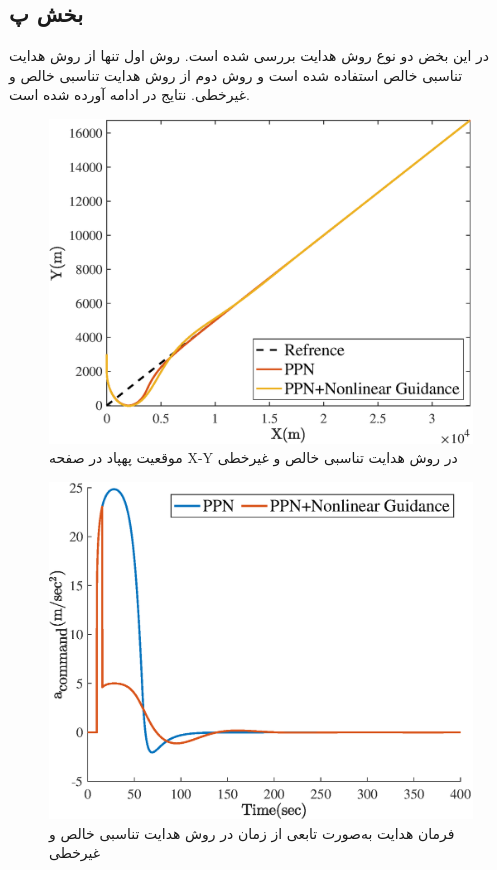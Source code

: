\subsection{بخش پ}
در این بخض دو نوع روش هدایت بررسی شده است. روش اول تنها از روش هدایت تناسبی خالص استفاده شده است و روش دوم از روش هدایت تناسبی خالص و غیرخطی. نتایج در ادامه آورده شده است.
\begin{figure}[H]
    \label{fig:q2_1}
	\centering
	\includegraphics[width=.75\linewidth]{../Figure/Q2/c/xy}
    \caption{موقعیت پهپاد در صفحه X-Y   در روش هدایت تناسبی خالص و غیرخطی}
\end{figure}

\begin{figure}[H]
    \label{fig:q2_1}
	\centering
	\includegraphics[width=.75\linewidth]{../Figure/Q2/c/acc}
    \caption{فرمان هدایت به‌صورت تابعی از زمان در روش هدایت تناسبی خالص و غیرخطی}
\end{figure}
